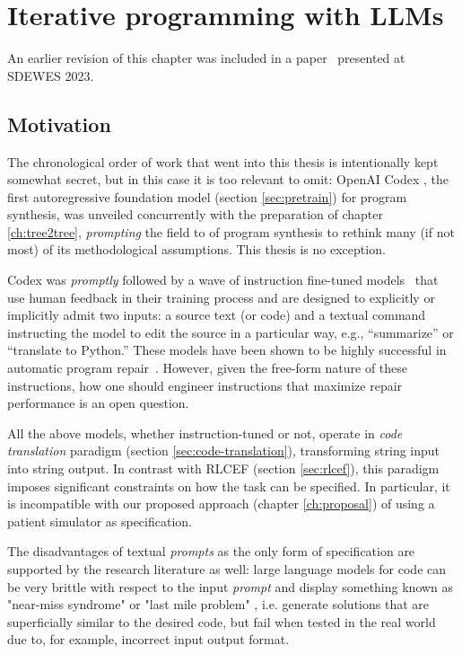 \chapter{Iterative programming with LLMs}
\label{ch:boptest}

\begin{remark}
  An earlier revision of this chapter was included in a paper~\cite{zabalaComparisonProgramSynthesis2023} presented at SDEWES 2023.
\end{remark}

\section{Motivation}

The chronological order of work that went into this thesis is intentionally kept somewhat secret, but in this case it is too relevant to omit: OpenAI Codex \cite{chenEvaluatingLargeLanguage2021}, the first autoregressive foundation model (section \ref{sec:pretrain}) for program synthesis, was unveiled concurrently with the preparation of chapter \ref{ch:tree2tree}, \emph{prompting} the field to of program synthesis to rethink many (if not most) of its methodological assumptions.
This thesis is no exception.

Codex was \emph{promptly} followed by a wave of instruction fine-tuned models~\cite{zhangInstructionTuningLarge2023} that use human feedback \cite{chaudhariRLHFDecipheredCritical2024, kaufmannSurveyReinforcementLearning2024} in their training process and are designed to explicitly or implicitly admit two inputs: a source text (or code) and a textual command instructing the model to edit the source in a particular way, e.g., ``summarize'' or ``translate to Python.''
These models have been shown to be highly successful in automatic program repair~\cite{fanAutomatedRepairPrograms2023}. 
However, given the free-form nature of these instructions, how one should engineer instructions that maximize repair performance is an open question. 

All the above models, whether instruction-tuned or not, operate in \emph{code translation} paradigm (section \ref{sec:code-translation}), transforming string input into string output.
In contrast with RLCEF (section \ref{sec:rlcef}), this paradigm imposes significant constraints on how the task can be specified.
In particular, it is incompatible with our proposed approach (chapter \ref{ch:proposal}) of using a patient simulator as specification.

The disadvantages of textual \emph{prompts} as the only form of specification are supported by the research literature as well: large language models for code can be very brittle with respect to the input \emph{prompt} \cite{Chen2024NLPerturbator, Erik2022Capturing, Hossen2024On, Shirafuji2023Exploring, Shivagunde2024Deconstructing, Verma2024On, Wang2022ReCode, Zhuo2023On} and display something known as "near-miss syndrome" or "last mile problem" \cite{bavishi2022:neurosymbolic, liuYourCodeGenerated2023, renCodeBLEUMethodAutomatic2020}, i.e. generate solutions that are superficially similar to the desired code, but fail when tested in the real world due to, for example, incorrect input output format.

